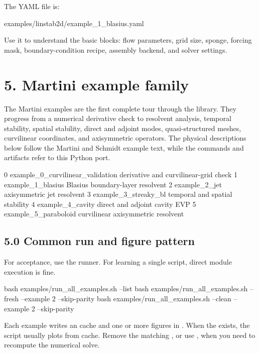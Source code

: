 \documentclass[11pt,a4paper]{article}
\newcommand{\code}[1]{\texttt{\detokenize{#1}}}
\begin{document}
The YAML file is:

\begin{outputbox}
examples/linstab2d/example_1_blasius.yaml
\end{outputbox}

Use it to understand the basic blocks: flow parameters, grid size, sponge, forcing mask, boundary-condition recipe, assembly backend, and solver settings.

\section*{5. Martini example family}

The Martini examples are the first complete tour through the library. They progress from a numerical derivative check to resolvent analysis, temporal stability, spatial stability, direct and adjoint modes, quasi-structured meshes, curvilinear coordinates, and axisymmetric operators. The physical descriptions below follow the Martini and Schmidt example text, while the commands and artifacts refer to this Python port.

\begin{outputbox}
0  example_0_curvilinear_validation  derivative and curvilinear-grid check
1  example_1_blasius                 Blasius boundary-layer resolvent
2  example_2_jet                     axisymmetric jet resolvent
3  example_3_streaky_bl              temporal and spatial stability
4  example_4_cavity                  direct and adjoint cavity EVP
5  example_5_paraboloid              curvilinear axisymmetric resolvent
\end{outputbox}

\subsection*{5.0 Common run and figure pattern}

For acceptance, use the runner. For learning a single script, direct module execution is fine.

\begin{commandbox}
bash examples/run_all_examples.sh --list
bash examples/run_all_examples.sh --fresh --example 2 --skip-parity
bash examples/run_all_examples.sh --clean --example 2 --skip-parity
\end{commandbox}

Each example writes an \code{.npz} cache and one or more \code{.png} figures in . When the \code{.npz} exists, the script usually plots from cache. Remove the matching \code{.npz}, or use \code{--clean}, when you need to recompute the numerical solve.
\end{document}
